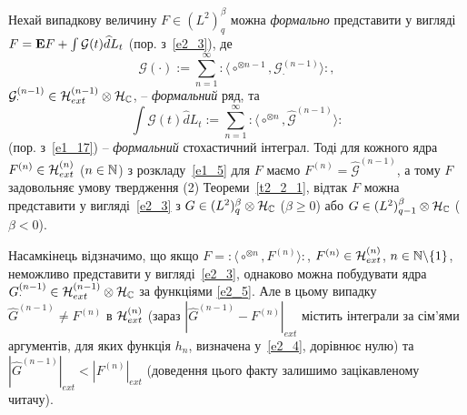 \begin{subremark}\label{r2_2_1}
Нехай випадкову величину $F\in (L^2)^\beta_q$ можна {\it формально}
представити у вигляді $F=\mathbf{E}{F}+\int\mathcal G(t)\widehat dL_t$ (пор. з~\eqref{e2_3}), де
\begin{equation*}
\mathcal G(\cdot):=\sum_{n=1}^\infty{:\!\langle}\circ^{\otimes n-1},
\mathcal G^{(n-1)}_\cdot{\rangle\!:},
\end{equation*}
$\mathcal G^{(n-1)}_\cdot\in\mathcal{H}_{ext}^{(n-1)}\otimes\mathcal{H}_{\mathbb{C}}$, --
{\it формальний} ряд, та
\begin{equation*}
\int\mathcal G(t)\widehat dL_t
:=\sum_{n=1}^\infty{:\!\langle}\circ^{\otimes n},\widehat{\mathcal G}^{(n-1)}{\rangle\!:}
\end{equation*}
(пор. з~\eqref{e1_17}) -- {\it формальний} стохастичний інтеграл. Тоді для кожного ядра
$F^{(n)}\in\mathcal{H}_{ext}^{(n)}$ ($n\in\mathbb{N}$) з розкладу~\eqref{e1_5} для $F$ маємо
$F^{(n)}=\widehat{\mathcal G}^{(n-1)}$, а тому $F$ задовольняє умову твердження (2)
Теореми~\ref{t2_2_1}, відтак $F$ можна представити у вигляді~\eqref{e2_3} з
$G\in (L^2)^\beta_q\otimes\mathcal{H}_{\mathbb{C}}$ ($\beta\geq 0$) або
$G\in (L^2)^\beta_{q-1}\otimes\mathcal{H}_{\mathbb{C}}$ ($\beta<0$).
\end{subremark}

Насамкінець відзначимо, що якщо $F={:\!\langle}\circ^{\otimes n},F^{(n)}{\rangle\!:}$,
$F^{(n)}\in\mathcal{H}_{ext}^{(n)}$, $n\in\mathbb{N}\backslash\{1\}$, неможливо представити
у вигляді~\eqref{e2_3}, однаково можна побудувати ядра
$G^{(n-1)}_\cdot\in\mathcal{H}_{ext}^{(n-1)}\otimes\mathcal{H}_{\mathbb{C}}$ за функціями
\eqref{e2_5}. Але в цьому випадку $\widehat G^{(n-1)}\not=F^{(n)}$ в $\mathcal{H}_{ext}^{(n)}$
(зараз $|\widehat G^{(n-1)}-F^{(n)}|_{ext}$ містить інтеграли за сім'ями аргументів, для яких
функція $h_n$, визначена у~\eqref{e2_4}, дорівнює нулю) та
$|\widehat G^{(n-1)}|_{ext}<|F^{(n)}|_{ext}$ (доведення цього факту залишимо зацікавленому
читачу).

